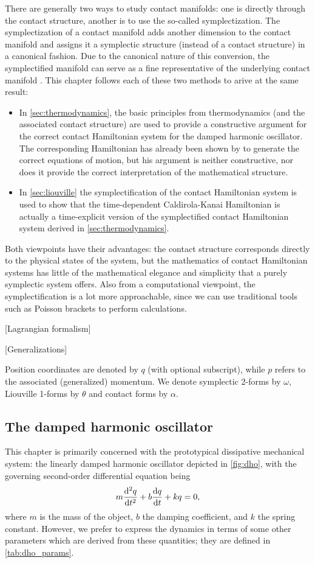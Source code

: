 There are generally two ways to study contact manifolds: one is directly through the contact structure, another is to use the so-called symplectization. The symplectization of a contact manifold adds another dimension to the contact manifold and assigns it a symplectic structure (instead of a contact structure) in a canonical fashion. Due to the canonical nature of this conversion, the symplectified manifold can serve as a fine representative of the underlying contact manifold \cite{Arnold1989}.
This chapter follows each of these two methods to arive at the same result:
\begin{itemize}
    \item In \cref{sec:thermodynamics}, the basic principles from thermodynamics (and the associated contact structure) are used to provide a constructive argument for the correct contact Hamiltonian system for the damped harmonic oscillator. The corresponding Hamiltonian has already been shown by \citet{Bravetti2017} to generate the correct equations of motion, but his argument is neither constructive, nor does it provide the correct interpretation of the mathematical structure.
    \item In \cref{sec:liouville} the symplectification of the contact Hamiltonian system is used to show that the time-dependent Caldirola-Kanai Hamiltonian is actually a time-explicit version of the symplectified contact Hamiltonian system derived in \cref{sec:thermodynamics}.
\end{itemize}
Both viewpoints have their advantages: the contact structure corresponds directly to the physical states of the system, but the mathematics of contact Hamiltonian systems has little of the mathematical elegance and simplicity that a purely symplectic system offers. Also from a computational viewpoint, the symplectification is a lot more approachable, since we can use traditional tools such as Poisson brackets to perform calculations.

[Lagrangian formalism]

[Generalizations]

Position coordinates are denoted by $q$ (with optional subscript), while $p$ refers to the associated (generalized) momentum. We denote symplectic 2-forms by $\omega$, Liouville 1-forms by $\theta$ and contact forms by $\alpha$.

\subsection{The damped harmonic oscillator} 
This chapter is primarily concerned with the prototypical dissipative mechanical system: the linearly damped harmonic oscillator depicted in \cref{fig:dho}, with the governing second-order differential equation being
\begin{equation}  
    m\dv[2]{q}{t} + b\dv{q}{t} + kq = 0,
    \label{eq:dho_eom}
\end{equation}
where $m$ is the mass of the object, $b$ the damping coefficient, and $k$ the spring constant. However, we prefer to express the dynamics in terms of some other parameters which are derived from these quantities; they are defined in \cref{tab:dho_params}.

